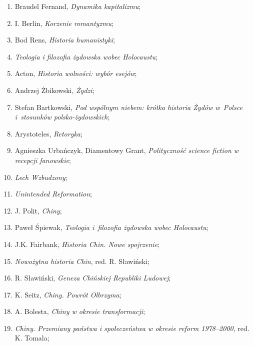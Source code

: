 \documentclass[a4paper,11pt]{article}
\begin{document}
\begin{enumerate}
\item Braudel Fernand, \emph{Dynamika kapitalizmu};

\item I. Berlin, \emph{Korzenie romantyzmu};

\item Bod Rens, \emph{Historia humanistyki};

\item \emph{Teologia i filozofia żydowska wobec Holocaustu};

\item Acton, \emph{Historia wolności: wybór esejów};

\item Andrzej Żbikowski, \emph{Żydzi};

\item Stefan Bartkowski, \emph{Pod wspólnym niebem: krótka historia
    Żydów w~Polsce i~stosunków polsko-żydowskich};

\item Arystoteles, \emph{Retoryka};

\item Agnieszka Urbańczyk, Diamentowy Grant, \emph{Polityczność
    science fiction w recepcji fanowskie};

\item \emph{Lech Wzbudzony};

\item \emph{Unintended Reformation};

\item J. Polit, \emph{Chiny};

\item Paweł Śpiewak, \emph{Teologia i~filozofia żydowska wobec
    Holocaustu};

\item J.K. Fairbank, \emph{Historia Chin. Nowe spojrzenie};

\item \emph{Nowożytna historia Chin}, red. R. Sławiński;

\item R. Sławiński, \emph{Geneza Chińskiej Republiki Ludowej};

\item K. Seitz, \emph{Chiny. Powrót Olbrzyma};

\item A. Bolesta, \emph{Chiny w okresie transformacji};

\item \emph{Chiny. Przemiany państwa i społeczeństwa w okresie reform
    1978--2000}, red. K. Tomala;


\end{enumerate}
\end{document}
